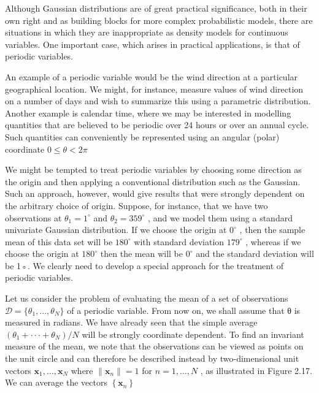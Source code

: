 \documentclass[
  10
]{article}
\begin{document}
Although Gaussian distributions are of great practical significance,
both in their own right and as building blocks for more complex
probabilistic models, there are situations in which they are
inappropriate as density models for continuous variables. One important
case, which arises in practical applications, is that of periodic
variables.

An example of a periodic variable would be the wind direction at a
particular geographical location. We might, for instance, measure values
of wind direction on a number of days and wish to summarize this using a
parametric distribution. Another example is calendar time, where we may
be interested in modelling quantities that are believed to be periodic
over 24 hours or over an annual cycle. Such quantities can conveniently
be represented using an angular (polar) coordinate
\(0 \leqslant \theta < 2 \pi\)

We might be tempted to treat periodic variables by choosing some
direction as the origin and then applying a conventional distribution
such as the Gaussian. Such an approach, however, would give results that
were strongly dependent on the arbitrary choice of origin. Suppose, for
instance, that we have two observations at
\(\theta _ { 1 } = 1 ^ { \circ }\) and
\(\theta _ { 2 } = 3 5 9 ^ { \circ }\) , and we model them using a
standard univariate Gaussian distribution. If we choose the origin at
\(0 ^ { \circ }\) , then the sample mean of this data set will be
\(1 8 0 ^ { \circ }\) with standard deviation \(1 7 9 ^ { \circ }\) ,
whereas if we choose the origin at \(1 8 0 ^ { \circ }\) then the mean
will be \(0 ^ { \circ }\) and the standard deviation will be 1◦. We
clearly need to develop a special approach for the treatment of periodic
variables.

Let us consider the problem of evaluating the mean of a set of
observations
\(\mathcal { D } = \{ \theta _ { 1 } , . . . , \theta _ { N } \}\) of a
periodic variable. From now on, we shall assume that θ is measured in
radians. We have already seen that the simple average
\(( \theta _ { 1 } + \cdot \cdot \cdot + \theta _ { N } ) / N\) will be
strongly coordinate dependent. To find an invariant measure of the mean,
we note that the observations can be viewed as points on the unit circle
and can therefore be described instead by two-dimensional unit vectors
\(\mathbf { x } _ { 1 } , \ldots , \mathbf { x } _ { N }\) where
\(\| \mathbf { x } _ { n } \| = 1\) for \(n = 1 , \ldots , N\) , as
illustrated in Figure 2.17. We can average the vectors
\(\left\{ \mathbf { x } _ { n } \right\}\)
\end{document}
